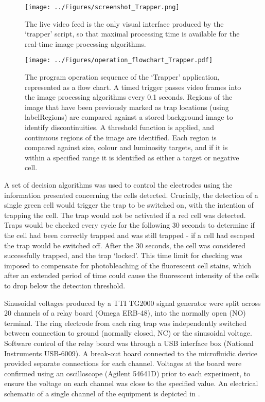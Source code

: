 \begin{figure}
	\centering
		\texttt{[image: ../Figures/screenshot\_Trapper.png]}
	\caption[The live video feed produced by the `Trapper' application.]{The live video feed is the only visual interface produced by the `trapper' script, so that maximal processing time is available for the real-time image processing algorithms.}
	\label{fig:screenshot_Trapper}
\end{figure}


\begin{figure}
	\centering
		\texttt{[image: ../Figures/operation\_flowchart\_Trapper.pdf]}
	\caption[The program operation sequence of the `Trapper' application.]{The program operation sequence of the `Trapper' application, represented as a flow chart. A timed trigger passes video frames into the image processing algorithms every 0.1 seconds. Regions of the image that have been previously marked as trap locations (using labelRegions) are compared against a stored background image to identify discontinuities. A threshold function is applied, and continuous regions of the image are identified. Each region is compared against size, colour and luminosity targets, and if it is within a specified range it is identified as either a target or negative cell.}
	\label{fig:operation_flowchart_Trapper}
\end{figure}

A set of decision algorithms was used to control the electrodes using the information presented concerning the cells detected. Crucially, the detection of a single green cell would trigger the trap to be switched on, with the intention of trapping the cell. The trap would not be activated if a red cell was detected. Traps would be checked every cycle for the following 30 seconds to determine if the cell had been correctly trapped and was still trapped - if a cell had escaped the trap would be switched off. After the 30 seconds, the cell was considered successfully trapped, and the trap `locked'. This time limit for checking was imposed to compensate for photobleaching of the fluorescent cell stains, which after an extended period of time could cause the fluorescent intensity of the cells to drop below the detection threshold.

Sinusoidal voltages produced by a TTI TG2000 signal generator were split across 20 channels of a relay board (Omega ERB-48), into the normally open (NO) terminal. The ring electrode from each ring trap was independently switched between connection to ground (normally closed, NC) or the sinusoidal voltage. Software control of the relay board was through a USB interface box (National Instruments USB-6009). A break-out board connected to the microfluidic device provided separate connections for each channel. Voltages at the board were confirmed using an oscilloscope (Agilent 54641D) prior to each experiment, to ensure the voltage on each channel was close to the specified value. An electrical schematic of a single channel of the equipment is depicted in .

